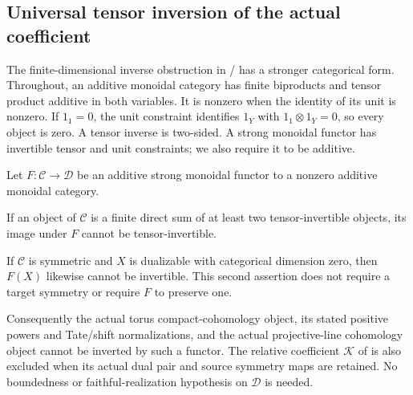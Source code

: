 \subsection{Universal tensor inversion of the actual coefficient}

The finite-dimensional inverse obstruction in
/ has a stronger categorical form.
Throughout, an additive monoidal category has finite
biproducts and tensor product additive in both variables.
It is nonzero when the identity of its unit is nonzero.
If \(1_1=0\), the unit constraint identifies
\(1_Y\) with \(1_1\otimes1_Y=0\), so every object is zero.
A tensor inverse is two-sided. A strong monoidal
functor has invertible tensor and unit constraints;
we also require it to be additive.

\begin{finding}
\label{f:universalCoefficientInversion}
Let \(F:\mathcal C\to\mathcal D\) be an additive
strong monoidal functor to a nonzero additive
monoidal category.

If an object of \(\mathcal C\) is a finite direct
sum of at least two tensor-invertible objects,
its image under \(F\) cannot be tensor-invertible.

If \(\mathcal C\) is symmetric and \(X\) is
dualizable with categorical dimension zero, then
\(F(X)\) likewise cannot be invertible.
This second assertion does not require a target
symmetry or require \(F\) to preserve one.

Consequently the actual torus compact-cohomology
object, its stated positive powers and Tate/shift
normalizations, and the actual projective-line
cohomology object cannot be inverted by such a functor.
The relative coefficient \(\mathcal K\) of
 is also excluded when its actual dual
pair and source symmetry maps are retained.
No boundedness or faithful-realization hypothesis
on \(\mathcal D\) is needed.
\end{finding}

